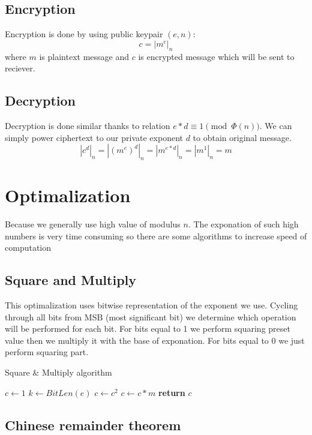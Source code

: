 \documentclass[thesis=B,english]{FITthesis}[2012/10/20]
\begin{document}
\subsection{Encryption}
{Encryption is done by using public keypair \((e, n)\): \[c = | m^e | _n\]
where \(m\) is plaintext message and \(c\) is encrypted message which will be sent to reciever.
}
\subsection{Decryption}
{Decryption is done similar thanks to relation \(e*d \equiv 1 \pmod{\Phi(n)}\). We can simply power ciphertext to our private exponent \(d\) to obtain original message.  \[ |c^d|_n = |(m^e)^d|_n = | m^{e*d}|_n = |m^1|_n = m\]}

\section{Optimalization}
{Because we generally use high value of modulus \(n\). The exponation of such high numbers is very time consuming so there are some algorithms to increase speed of computation }

\subsection{Square and Multiply}
{This optimalization uses bitwise representation of the exponent we use. Cycling through all bits from MSB (most significant bit) 
we determine which operation will be performed for each bit. For bits equal to 1 we perform squaring preset value then we multiply it with the base of exponation. 
For bits equal to 0 we just perform squaring part.}

\begin{algorithm}
\caption{Square \& Multiply algorithm}
\begin{algorithmic}[1]

 \State $c\gets 1$
 \State $k\gets BitLen(e)$
  \State $c \gets c^2$
   \State $c \gets c * m$
  \EndIf
 \EndFor
\State \textbf{return} $c$
\EndFunction
 
\end{algorithmic}
\end{algorithm}


\subsection{Chinese remainder theorem}
\end{document}
